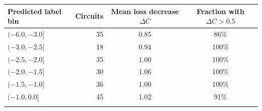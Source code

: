 \begin{tabular}{lrcc}
\toprule
Predicted label bin & Circuits & Mean loss decrease $\Delta C$ & Fraction with $\Delta C>0.5$ \\
\midrule
$(-6.0, -3.0]$ & 35 & 0.85 & 86\% \\
$(-3.0, -2.5]$ & 18 & 0.94 & 100\% \\
$(-2.5, -2.0]$ & 35 & 1.00 & 100\% \\
$(-2.0, -1.5]$ & 30 & 1.06 & 100\% \\
$(-1.5, -1.0]$ & 36 & 1.00 & 100\% \\
$(-1.0, 0.0]$ & 45 & 1.02 & 91\% \\
\botrule
\end{tabular}
